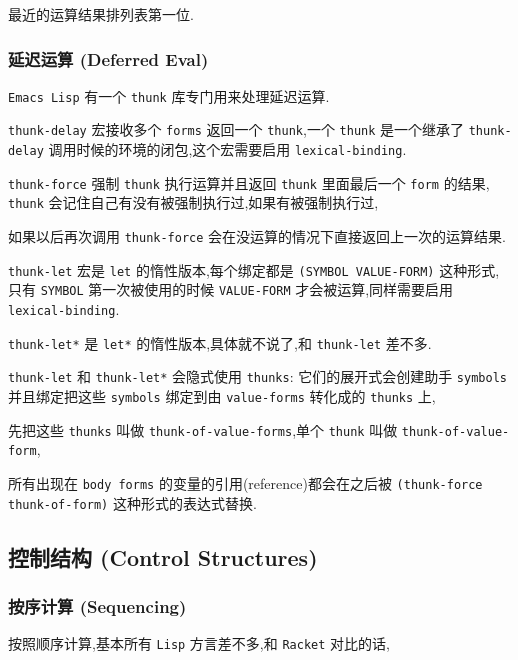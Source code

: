 \documentclass[11pt]{article}
\begin{document}
最近的运算结果排列表第一位.


\subsubsection{延迟运算 (Deferred Eval)}
\label{sec:org949d7b8}

\texttt{Emacs Lisp} 有一个 \texttt{thunk} 库专门用来处理延迟运算.

\texttt{thunk-delay} 宏接收多个 \texttt{forms} 返回一个 \texttt{thunk},一个 \texttt{thunk} 是一个继承了 \texttt{thunk-delay} 调用时候的环境的闭包,这个宏需要启用 \texttt{lexical-binding}.

\texttt{thunk-force} 强制 \texttt{thunk} 执行运算并且返回 \texttt{thunk} 里面最后一个 \texttt{form} 的结果, \texttt{thunk} 会记住自己有没有被强制执行过,如果有被强制执行过,

如果以后再次调用 \texttt{thunk-force} 会在没运算的情况下直接返回上一次的运算结果.

\texttt{thunk-let} 宏是 \texttt{let} 的惰性版本,每个绑定都是 \texttt{(SYMBOL VALUE-FORM)} 这种形式,只有 \texttt{SYMBOL} 第一次被使用的时候 \texttt{VALUE-FORM} 才会被运算,同样需要启用 \texttt{lexical-binding}.

\texttt{thunk-let*} 是 \texttt{let*} 的惰性版本,具体就不说了,和 \texttt{thunk-let} 差不多.

\texttt{thunk-let} 和 \texttt{thunk-let*} 会隐式使用 \texttt{thunks}: 它们的展开式会创建助手 \texttt{symbols} 并且绑定把这些 \texttt{symbols} 绑定到由 \texttt{value-forms} 转化成的 \texttt{thunks} 上,

先把这些 \texttt{thunks} 叫做 \texttt{thunk-of-value-forms},单个 \texttt{thunk} 叫做 \texttt{thunk-of-value-form},

所有出现在 \texttt{body forms} 的变量的引用(reference)都会在之后被 \texttt{(thunk-force  thunk-of-form)} 这种形式的表达式替换.



\subsection{控制结构 (Control Structures)}
\label{sec:orgd9ba9d2}


\subsubsection{按序计算 (Sequencing)}
\label{sec:org04716a4}

按照顺序计算,基本所有 \texttt{Lisp} 方言差不多,和 \texttt{Racket} 对比的话,
\end{document}
